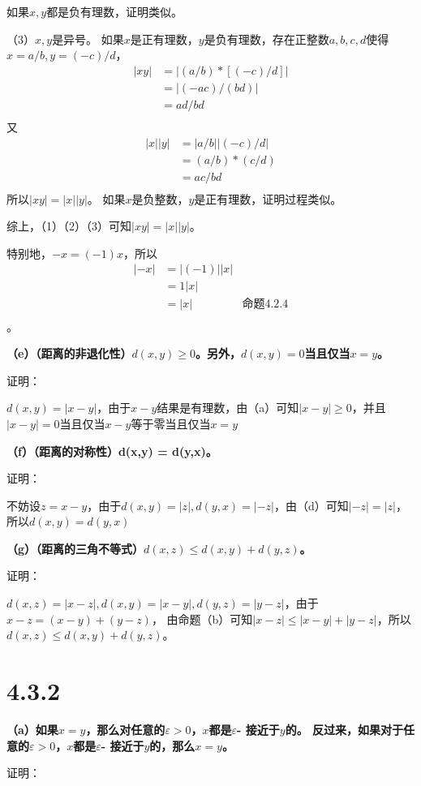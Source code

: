 \documentclass{article}
\theoremstyle{mystyle}
\begin{document}
如果$x,y$都是负有理数，证明类似。

（3）$x,y$是异号。
如果$x$是正有理数，$y$是负有理数，存在正整数$a,b,c,d$使得$x=a/b,y=(-c)/d$，
\begin{align*}
  |xy| & = |(a/b) * [(-c)/d]| \\
       & = |(-ac)/(bd)|       \\
       & = ad/bd              \\
\end{align*}
又
\begin{align*}
  |x||y| & = |a/b||(-c)/d| \\
         & = (a/b) * (c/d) \\
         & = ac/bd         \\
\end{align*}
所以$|xy|=|x||y|$。
如果$x$是负整数，$y$是正有理数，证明过程类似。

综上，（1）（2）（3）可知$|xy|=|x||y|$。

特别地，$-x=(-1)x$，所以
\begin{align*}
  |-x| & =|(-1)||x|                  \\
       & =1|x|                       \\
       & =|x|       & \text{命题4.2.4} \\
\end{align*}。

\textbf{（e）（距离的非退化性）$d(x,y) \geq 0$。另外，$d(x,y)=0$当且仅当$x=y$。 }

证明：

$d(x,y) = |x-y|$，由于$x-y$结果是有理数，由（a）可知$|x-y| \geq 0$，并且$|x-y|=0$当且仅当$x-y$等于零当且仅当$x=y$

\textbf{（f）（距离的对称性）d(x,y) = d(y,x)。}

证明：

不妨设$z = x - y$，由于$d(x,y)=|z|,d(y,x)=|-z|$，由（d）可知$|-z|=|z|$，所以$d(x,y)=d(y,x)$

\textbf{（g）（距离的三角不等式）$d(x,z) \leq d(x,y) + d(y,z)$。}

证明：

$d(x,z)=|x-z|,d(x,y)=|x-y|,d(y,z)=|y-z|$，由于$x-z = (x-y)+(y-z)$，
由命题（b）可知$|x-z| \leq |x-y| + |y-z|$，所以$d(x,z) \leq d(x,y) + d(y,z)$。

\section*{4.3.2}

\textbf{（a）如果$x=y$，那么对任意的$\varepsilon > 0$，$x$都是$\varepsilon$- 接近于$y$的。
  反过来，如果对于任意的$\varepsilon > 0$，$x$都是$\varepsilon$- 接近于$y$的，那么$x=y$。}

证明：
\end{document}
